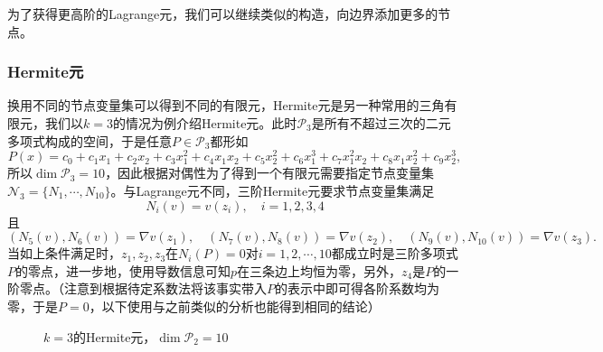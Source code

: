 \documentclass[a4paper,10pt]{ctexart}
\begin{document}
为了获得更高阶的Lagrange元，我们可以继续类似的构造，向边界添加更多的节点。

\subsubsection{Hermite元}
换用不同的节点变量集可以得到不同的有限元，Hermite元是另一种常用的三角有限元，我们以$ k=3 $的情况为例介绍Hermite元。此时$ \mathcal{P}_3 $是所有不超过三次的二元多项式构成的空间，于是任意$ P\in \mathcal{P}_3 $都形如
\[
    P(x) = c_0 + c_1 x_1 + c_2 x_2 + c_3 x_1^2 + c_4 x_1x_2 + c_5 x_2^2 + c_6 x_1^3 + c_7 x_1^2x_2 + c_8 x_1x_2^2 + c_9 x_2^3,
\]
所以$ \dim \mathcal{P}_3 = 10 $，因此根据对偶性为了得到一个有限元需要指定节点变量集$ \mathcal{N}_3 = \{N_1,\cdots ,N_{10}\} $。与Lagrange元不同，三阶Hermite元要求节点变量集满足
\begin{equation}
    N_i(v) = v(z_i),\quad i = 1,2,3,4
\end{equation}
且
\begin{equation}
    (N_5(v),N_6(v)) = \nabla v(z_1),\quad (N_7(v),N_8(v)) = \nabla v(z_2),\quad (N_9(v),N_{10}(v)) = \nabla v(z_3).
\end{equation}
当如上条件满足时，$ z_1,z_2,z_3 $在$ N_i(P)=0 $对$ i=1,2,\cdots ,10 $都成立时是三阶多项式$ P $的零点，进一步地，使用导数信息可知$ p $在三条边上均恒为零，另外，$ z_4 $是$ P $的一阶零点。（注意到根据待定系数法将该事实带入$ P $的表示中即可得各阶系数均为零，于是$ P=0 $，以下使用与之前类似的分析也能得到相同的结论）

\begin{figure}[htpb]
    \centering
    \caption{$ k=3 $的Hermite元，$ \dim \mathcal{P}_2= 10 $}
    \label{fig:Hermite_3}
\end{figure}
\end{document}
